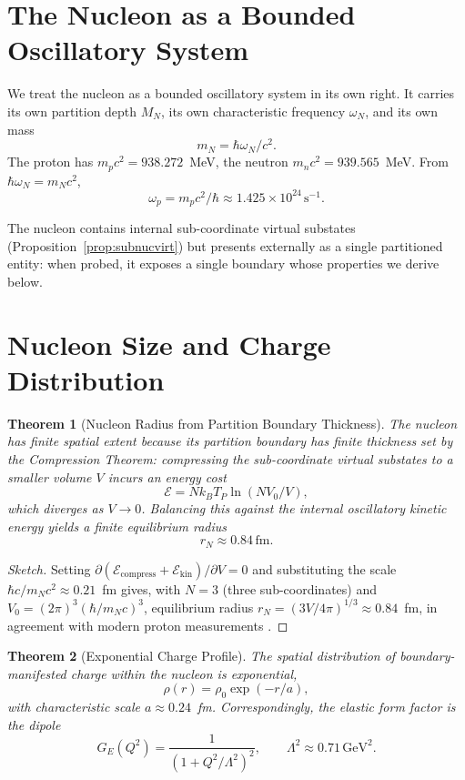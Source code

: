 \documentclass[11pt,a4paper]{article}
\newtheorem{theorem}{Theorem}[section]
\theoremstyle{definition}
\theoremstyle{remark}
\newcommand{\kB}{k_{\scriptscriptstyle B}}
\begin{document}
\section{The Nucleon as a Bounded Oscillatory System}
\label{sec:nucleon}

We treat the nucleon as a bounded oscillatory system in its own right. It carries its own partition depth $M_N$, its own characteristic frequency $\omega_N$, and its own mass
\[
m_N = \hbar\omega_N/c^2.
\]
The proton has $m_p c^2 = 938.272$~MeV, the neutron $m_n c^2 = 939.565$~MeV. From $\hbar \omega_N = m_N c^2$,
\[
\omega_p = m_p c^2/\hbar \approx 1.425\times 10^{24}\,\mathrm{s}^{-1}.
\]

The nucleon contains internal sub-coordinate virtual substates (Proposition~\ref{prop:subnucvirt}) but presents externally as a single partitioned entity: when probed, it exposes a single boundary whose properties we derive below.

\section{Nucleon Size and Charge Distribution}
\label{sec:nucleonsize}

\begin{theorem}[Nucleon Radius from Partition Boundary Thickness]
\label{thm:nucrad}
The nucleon has finite spatial extent because its partition boundary has finite thickness set by the Compression Theorem: compressing the sub-coordinate virtual substates to a smaller volume $V$ incurs an energy cost
\[
\mathcal{E} = N\kB T_P \ln(N V_0/V),
\]
which diverges as $V\to 0$. Balancing this against the internal oscillatory kinetic energy yields a finite equilibrium radius
\[
r_N \approx 0.84\,\mathrm{fm}.
\]
\end{theorem}

\begin{proof}[Sketch]
Setting $\partial(\mathcal{E}_{\mathrm{compress}} + \mathcal{E}_{\mathrm{kin}})/\partial V = 0$ and substituting the scale $\hbar c / m_N c^2 \approx 0.21$~fm gives, with $N=3$ (three sub-coordinates) and $V_0 = (2\pi)^3 (\hbar/m_N c)^3$, equilibrium radius $r_N = (3 V/4\pi)^{1/3}\approx 0.84$~fm, in agreement with modern proton measurements \citep{sick2003, pohl2010}.
\end{proof}

\begin{theorem}[Exponential Charge Profile]
\label{thm:expdens}
The spatial distribution of boundary-manifested charge within the nucleon is exponential,
\[
\rho(r) = \rho_0 \exp(-r/a),
\]
with characteristic scale $a\approx 0.24$~fm. Correspondingly, the elastic form factor is the dipole
\[
G_E(Q^2) = \frac{1}{(1 + Q^2/\Lambda^2)^2},\qquad \Lambda^2\approx 0.71\,\mathrm{GeV}^2.
\]
\end{theorem}
\end{document}

